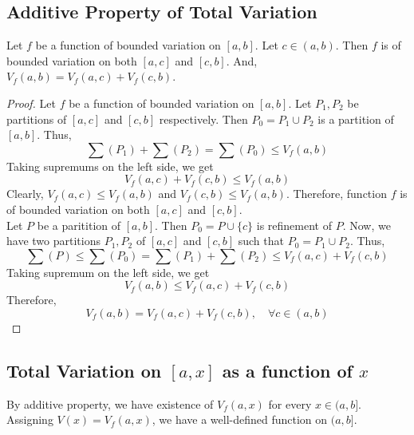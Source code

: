 \subsection{Additive Property of Total Variation}
\begin{theorem}
	Let $f$ be a function of bounded variation on $[a,b]$.
	Let $c \in (a,b)$.
	Then $f$ is of bounded variation on both $[a,c]$ and $[c,b]$.
	And, $V_f(a,b) = V_f(a,c)+V_f(c,b)$.
\end{theorem}
\begin{proof}
	Let $f$ be a function of bounded variation on $[a,b]$.
	Let $P_1,P_2$ be partitions of $[a,c]$ and $[c,b]$ respectively.
	Then $P_0 = P_1 \cup P_2$ is a partition of $[a,b]$.
	Thus,
	\[ \sum (P_1) + \sum (P_2) = \sum (P_0) \le V_f(a,b) \]
	Taking supremums on the left side, we get
	\[ V_f(a,c) + V_f(c,b) \le V_f(a,b) \]	
	Clearly, $V_f(a,c) \le V_f(a,b)$ and $V_f(c,b) \le V_f(a,b)$.
	Therefore, function $f$ is of bounded variation on both $[a,c]$ and $[c,b]$.\\

	Let $P$ be a paritition of $[a,b]$.
	Then $P_0 = P\cup\{c\}$ is refinement of $P$.
	Now, we have two partitions $P_1, P_2$ of $[a,c]$ and $[c,b]$ such that $P_0 = P_1 \cup P_2$.
	Thus,
	\[ \sum (P) \le \sum (P_0) = \sum (P_1) + \sum (P_2) \le V_f(a,c) + V_f(c,b) \]
	Taking supremum on the left side, we get
	\[ V_f(a,b) \le V_f(a,c) + V_f(c,b) \]
	Therefore,
	\[ V_f(a,b) = V_f(a,c) + V_f(c,b),\quad \forall c \in (a,b) \]
\end{proof}

\subsection{Total Variation on $[a,x]$ as a function of $x$}
\begin{commentary}
	By additive property, we have existence of $V_f(a,x)$ for every $x \in (a,b]$.
	Assigning $V(x) = V_f(a,x)$, we have a well-defined function on $(a,b]$.
\end{commentary}

